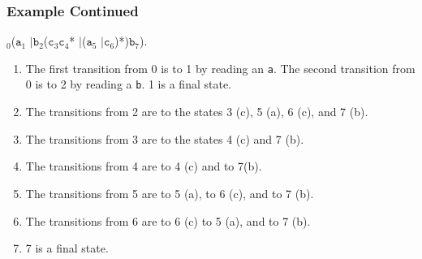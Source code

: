 \documentclass{beamer}
\theoremstyle{remark}
\newcommand{\alternative}{$\mid$\;}
\begin{document}
\begin{frame}
	\frametitle{Example Continued}
	$_0$($\mathtt{a}_1$ \alternative $\mathtt{b}_2$($\mathtt{c}_3\mathtt{c}_4$* \alternative ($\mathtt{a}_5$  \alternative $\mathtt{c}_6$)*)$\mathtt{b}_7$).
	
	\begin{enumerate}
		\item The first transition from 0 is to 1 by reading an {\tt a}. The second transition from 0 is to 2 by reading a {\tt b}. 1 is a final state.
		
		\pause
		
		\item The transitions from 2 are to the states 3 (c), 5 (a), 6 (c), and 7 (b).
		
		\pause
		
		\item The transitions from 3 are to the states 4 (c) and 7 (b).
		
		\pause
		
		\item The transitions from 4 are to 4 (c) and to 7(b).
		
		\pause
		
		\item The transitions from 5 are to 5 (a), to 6 (c), and to 7 (b).
		
		\pause
		
		\item The transitions from 6 are to 6 (c) to 5 (a), and to 7 (b).
		
		\pause
		
		\item 7 is a final state.
	\end{enumerate}
\end{frame}
\end{document}
